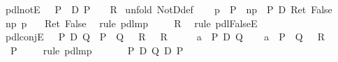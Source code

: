\begin{isabellebody}
\isamarkupfalse%
\isanewline
\isanewline
\isanewline
\isamarkupfalse%
\ pdl{\isacharunderscore}notE{\isacharcolon}\ {\isachardoublequote}{\isasymlbrakk}\ {\isasymturnstile}\ P{\isacharsemicolon}\ {\isasymturnstile}\ {\isasymnot}\isactrlsub D\ P\ {\isasymrbrakk}\ {\isasymLongrightarrow}\ {\isasymturnstile}\ R{\isachardoublequote}\isanewline
\isamarkupfalse%
\ {\isacharparenleft}unfold\ NotD{\isacharunderscore}def{\isacharparenright}\isanewline
\ \ \isamarkupfalse%
\ p{\isacharcolon}\ {\isachardoublequote}{\isasymturnstile}\ P{\isachardoublequote}\ \ np{\isacharcolon}\ {\isachardoublequote}{\isasymturnstile}\ P\ {\isasymlongrightarrow}\isactrlsub D\ Ret\ False{\isachardoublequote}\isanewline
\ \ \isamarkupfalse%
\ np\ p\ \isamarkupfalse%
\ {\isachardoublequote}{\isasymturnstile}\ Ret\ False{\isachardoublequote}\ \isamarkupfalse%
\ {\isacharparenleft}rule\ pdl{\isacharunderscore}mp{\isacharparenright}\isanewline
\ \ \isamarkupfalse%
\ {\isachardoublequote}{\isasymturnstile}\ R{\isachardoublequote}\ \isamarkupfalse%
\ {\isacharparenleft}rule\ pdl{\isacharunderscore}FalseE{\isacharparenright}\isanewline
\isamarkupfalse%
\isanewline
\isanewline
\isanewline
\isamarkupfalse%
\ pdl{\isacharunderscore}conjE{\isacharcolon}\ {\isachardoublequote}{\isasymlbrakk}\ {\isasymturnstile}\ P\ {\isasymand}\isactrlsub D\ Q{\isacharsemicolon}\ {\isasymlbrakk}{\isasymturnstile}\ P{\isacharsemicolon}\ {\isasymturnstile}\ Q{\isasymrbrakk}\ {\isasymLongrightarrow}\ {\isasymturnstile}\ R{\isasymrbrakk}\ {\isasymLongrightarrow}\ {\isasymturnstile}\ R{\isachardoublequote}\isanewline
\isamarkupfalse%
\ {\isacharminus}\isanewline
\ \ \isamarkupfalse%
\ a{}{\isacharcolon}\ {\isachardoublequote}{\isasymturnstile}\ P\ {\isasymand}\isactrlsub D\ Q{\isachardoublequote}\isanewline
\ \ \isamarkupfalse%
\ a{}{\isacharcolon}\ {\isachardoublequote}{\isasymlbrakk}{\isasymturnstile}\ P{\isacharsemicolon}\ {\isasymturnstile}\ Q{\isasymrbrakk}\ {\isasymLongrightarrow}\ {\isasymturnstile}\ R{\isachardoublequote}\isanewline
\ \ \isamarkupfalse%
\ {\isachardoublequote}{\isasymturnstile}\ P{\isachardoublequote}\ \isanewline
\ \ \isamarkupfalse%
\ {\isacharparenleft}rule\ pdl{\isacharunderscore}mp{\isacharparenright}\isanewline
\ \ \ \ \isamarkupfalse%
\ {\isachardoublequote}{\isasymturnstile}\ P\ {\isasymand}\isactrlsub D\ Q\ {\isasymlongrightarrow}\isactrlsub D\ P{\isachardoublequote}\ \isamarkupfalse%

\end{isabellebody}
